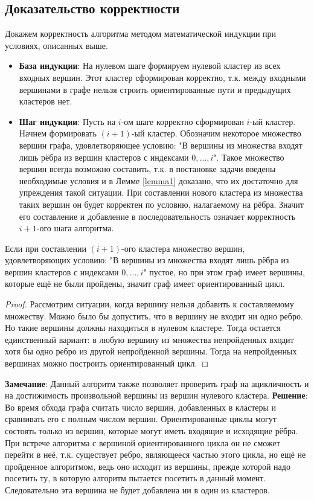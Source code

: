 \subsection{Доказательство корректности}
\label{sec:validalg}
Докажем корректность алгоритма методом математической индукции при условиях, описанных выше. 
\begin{itemize}
    \item \textbf{База индукции}: На нулевом шаге формируем нулевой кластер из всех входных вершин. Этот кластер сформирован корректно, т.к. между входными вершинами в графе нельзя строить ориентированные пути и предыдущих кластеров нет.
    \item \textbf{Шаг индукции}: Пусть на $i$-ом шаге корректно сформирован $i$-ый кластер. Начнем формировать $(i+1)$-ый кластер. Обозначим некоторое множество вершин графа, удовлетворяющее условию: "В вершины из множества входят лишь рёбра из вершин кластеров с индексами $0, \ldots, i$". Такое множество вершин всегда возможно составить, т.к. в постановке задачи введены необходимые условия и в Лемме \ref{lemma1} доказано, что их достаточно для упреждения такой ситуации. При составлении нового кластера из множества таких вершин он будет корректен по условию, налагаемому на рёбра. Значит его составление и добавление в последовательность означает корректность $i+1$-ого шага алгоритма.
\end{itemize}
\begin{lemma}\label{lemma1}
Если при составлении $(i+1)$-ого кластера множество вершин, удовлетворяющих условию: "В вершины из множества входят лишь рёбра из вершин кластеров с индексами $0, \ldots, i$" пустое, но при этом граф имеет вершины, которые ещё не были пройдены, значит граф имеет ориентированный цикл.
\end{lemma}
\begin{proof}
Рассмотрим ситуации, когда вершину нельзя добавить к составляемому множеству. Можно было бы допустить, что в вершину не входит ни одно ребро. Но такие вершины должны находиться в нулевом кластере. Тогда остается единственный вариант: в любую вершину из множества непройденных входит хотя бы одно ребро из другой непройденной вершины. Тогда на непройденных вершинах можно построить ориентированный цикл.
\end{proof}
\textbf{Замечание}: Данный алгоритм также позволяет проверить граф на ацикличность и на достижимость произвольной вершины из вершин нулевого кластера. \newline
\textbf{Решение}: Во время обхода графа считать число вершин, добавленных в кластеры и сравнивать его с полным числом вершин. Ориентированные циклы могут состоять только из вершин, которые могут иметь входящие и исходящие рёбра. При встрече алгоритма с вершиной ориентированного цикла он не сможет перейти в неё, т.к. существует ребро, являющееся частью этого цикла, но ещё не пройденное алгоритмом, ведь оно исходит из вершины, прежде которой надо посетить ту, в которую алгоритм пытается посетить в данный момент. Следовательно эта вершина не будет добавлена ни в один из кластеров.

